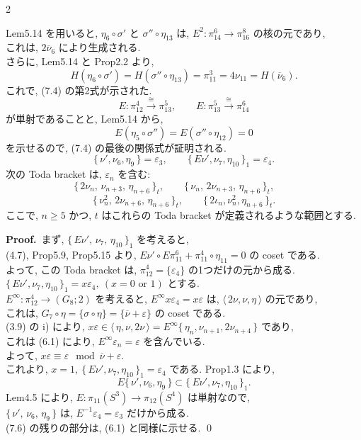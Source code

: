 \documentclass[10pt, leqno]{ltjsarticle}
\newcommand{\ov}[1]{\overline{#1}}
\newcommand{\toda}[1]{\{\,#1\,\}}              %
\newcommand{\todai}[2][]{\{\,#2\,\}_{#1}}      %
\newcommand{\todas}[1]{\langle\,#1\,\rangle}
\newcommand{\gen}[1]{\{#1\}}       %
\newcommand{\pit}[2]{\pi_{#1}^{#2}}
\numberwithin{equation}{section}
\theoremstyle{plain}
\theoremstyle{definition}
\theoremstyle{remark}
\begin{document}
\begin{paracol}{2}

\noindent
Lem5.14 を用いると, 
\(\eta_{6}\circ\sigma'\) と \(\sigma''\circ\eta_{13}\) は,
\(E^{2}:\pit{14}{6}\to\pit{16}{8}\) の核の元であり, \\
これは, \(2\ov{\nu}_{6}\) により生成される. \\
さらに,  Lem5.14 と Prop2.2 より, 
\[
H(\eta_{6}\circ\sigma')=H(\sigma''\circ\eta_{13})
=\pit{11}{3}=4\nu_{11}=H(\ov{\nu}_{6}).
\]
これで, (7.4) の第2式が示された. 
\[
E:\pit{12}{4}\xrightarrow{\ \cong\ }\pit{13}{5},\qquad
E:\pit{13}{5}\xrightarrow{\ \cong\ }\pit{14}{6}
\]
が単射であることと,  Lem5.14 から, 
\[
E(\eta_{5}\circ\sigma'')=E(\sigma''\circ\eta_{12})=0
\]
を示せるので, (7.4) の最後の関係式が証明される. 
%
\begin{equation}
  \toda{\nu', \nu_6, \eta_9} = \varepsilon_3,\qquad
  \todai[1]{E\nu', \nu_7, \eta_{10}} = \varepsilon_4 .
\end{equation}
\qquad
次の Toda bracket は, \(\varepsilon_{n}\) を含む:  
\[
\toda{2\nu_{n},\,\nu_{n+3},\,\eta_{n+6}}_{t},\qquad
\toda{\nu_{n},\,2\nu_{n+3},\,\eta_{n+6}}_{t},\qquad
\]
\[
\toda{\nu_{n}^{2},\,2\nu_{n+6},\,\eta_{n+6}}_{t},\qquad
\todai[t]{2\iota_n, \nu_n^2, \eta_{n+6}} .
\]
\qquad 
ここで, \(n\ge5\) かつ, \(t\) はこれらの Toda bracket が定義されるような範囲とする. 

\noindent
\textbf{Proof.}\
まず, \(\toda{E\nu',\,\nu_{7},\,\eta_{10}}_{1}\) を考えると, \\
(4.7),  Prop5.9,  Prop5.15 より, 
\(E\nu'\circ E\pi_{11}^{6}+\pi_{11}^{4}\circ\eta_{11}=0\) 
の coset である. \\
よって, この Toda bracket は, 
\(\pit{12}{4} = \gen{\varepsilon_{4}}\) 
の1つだけの元から成る. \\
\(\todai[1]{E\nu', \nu_7, \eta_{10}} = x\varepsilon_4,\ (x = 0 \text{ or } 1)\)
とする. \\
\(E^{\infty}:\pit{12}{4}\to(G_8; 2)\) を考えると, 
\(E^{\infty} x\varepsilon_4 = x \varepsilon\)
は, \(\todas{2\nu, \nu, \eta}\) の元であり, \\
これは, \(G_7\circ \eta = \gen{\sigma\circ\eta} = \gen{\ov{\nu} + \varepsilon}\)
の coset である. \\
(3.9) の i) により, 
\(x\varepsilon\in \todas{\eta, \nu, 2\nu} 
= E^\infty\toda{\eta_n, \nu_{n+1}, 2\nu_{n+4}}\)
であり, \\
これは (6.1) により, \(E^\infty \varepsilon_n=\varepsilon\) を含んでいる. \\
よって, \(x\varepsilon \equiv \varepsilon \mod \ov{\nu} + \varepsilon .\)\\
これより, \(x = 1, \ \todai[1]{E\nu', \nu_7, \eta_{10}} = \varepsilon_{4}\) である. 
Prop1.3 により, 
\[
E\toda{\nu', \nu_6, \eta_9}
\subset \todai[1]{E\nu', \nu_7, \eta_{10}} .
\]
Lem4.5 により, \(E:\pi_{11}(S^{3})\to\pi_{12}(S^{4})\) は単射なので, \\
\(\toda{\nu',\,\nu_6,\,\eta_{9}}\) は,
\(E^{-1}\varepsilon_{4}=\varepsilon_{3}\) だけから成る. \\
(7.6) の残りの部分は, (6.1) と同様に示せる.  
\qed


\end{paracol}
\end{document}
